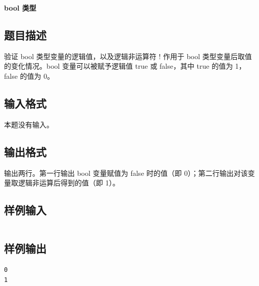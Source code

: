 \documentclass{article}
\newcommand{\problemname}[1]{\begin{center}\Large\bfseries #1\end{center}}
\begin{document}
\problemname{bool 类型}

\subsection*{题目描述}
验证 bool 类型变量的逻辑值，以及逻辑非运算符 ! 作用于 bool 类型变量后取值的变化情况。bool 变量可以被赋予逻辑值 true 或 false，其中 true 的值为 1，false 的值为 0。

\subsection*{输入格式}
本题没有输入。

\subsection*{输出格式}
输出两行。第一行输出 bool 变量赋值为 false 时的值（即 0）；第二行输出对该变量取逻辑非运算后得到的值（即 1）。

\subsection*{样例输入}
\begin{verbatim}

\end{verbatim}

\subsection*{样例输出}
\begin{verbatim}
0
1
\end{verbatim}
\end{document}
